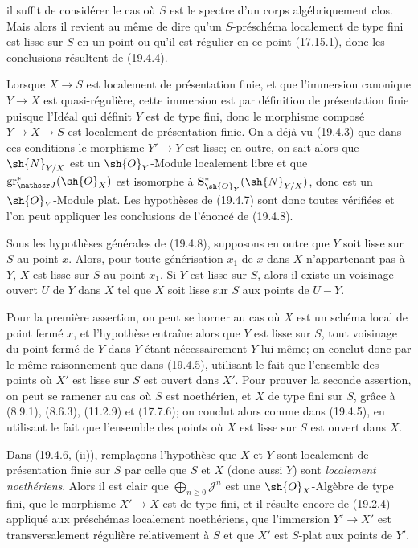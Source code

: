 
il suffit de considérer le cas où $S$ est le spectre d'un corps algébriquement clos. Mais alors il revient au même de dire qu'un $S$-préschéma localement de type fini est lisse sur $S$ en un point ou qu'il est régulier en ce point (17.15.1), donc les conclusions résultent de (19.4.4).

Lorsque $X\to S$ est localement de présentation finie, et que l'immersion canonique $Y\to X$ est quasi-régulière, cette immersion est par définition de présentation finie puisque l'Idéal qui définit $Y$ est de type fini, donc le morphisme composé $Y\to X\to S$ est localement de présentation finie. On a déjà vu (19.4.3) que dans ces conditions le morphisme $Y'\to Y$ est lisse; en outre, on sait alors que $\sh{N}_{Y/X}$ est un $\sh{O}_Y$-Module localement libre et que $\operatorname{gr}_{\mathscr J}^*(\sh{O}_X)$ est isomorphe à $\mathbf S_{\sh{O}_Y}^*(\sh{N}_{Y/X})$, donc est un $\sh{O}_Y$-Module plat. Les hypothèses de (19.4.7) sont donc toutes vérifiées et l'on peut appliquer les conclusions de l'énoncé de (19.4.8).

\begin{corollary}[19.4.9]
\label{IV.19.4.9}
Sous les hypothèses générales de (19.4.8), supposons en outre que $Y$ soit lisse sur $S$ au point $x$. Alors, pour toute générisation $x_1$ de $x$ dans $X$ n'appartenant pas à $Y$, $X$ est lisse sur $S$ au point $x_1$. Si $Y$ est lisse sur $S$, alors il existe un voisinage ouvert $U$ de $Y$ dans $X$ tel que $X$ soit lisse sur $S$ aux points de $U-Y$.
\end{corollary}

Pour la première assertion, on peut se borner au cas où $X$ est un schéma local de point fermé $x$, et l'hypothèse entraîne alors que $Y$ est lisse sur $S$, tout voisinage du point fermé de $Y$ dans $Y$ étant nécessairement $Y$ lui-même; on conclut donc par le même raisonnement que dans (19.4.5), utilisant le fait que l'ensemble des points où $X'$ est lisse sur $S$ est ouvert dans $X'$. Pour prouver la seconde assertion, on peut se ramener au cas où $S$ est noethérien, et $X$ de type fini sur $S$, grâce à (8.9.1), (8.6.3), (11.2.9) et (17.7.6); on conclut alors comme dans (19.4.5), en utilisant le fait que l'ensemble des points où $X$ est lisse sur $S$ est ouvert dans $X$.

\begin{remark}[19.4.10]
\label{IV.19.4.10}
Dans (19.4.6, (ii)), remplaçons l'hypothèse que $X$ et $Y$ sont localement de présentation finie sur $S$ par celle que $S$ et $X$ (donc aussi $Y$) sont \emph{localement noethériens}. Alors il est clair que $\bigoplus_{n\geq0}\mathscr J^n$ est une $\sh{O}_X$-Algèbre de type fini, que le morphisme $X'\to X$ est de type fini, et il résulte encore de (19.2.4) appliqué aux préschémas localement noethériens, que l'immersion $Y'\to X'$ est transversalement régulière relativement à $S$ et que $X'$ est $S$-plat aux points de $Y'$.
\end{remark}

